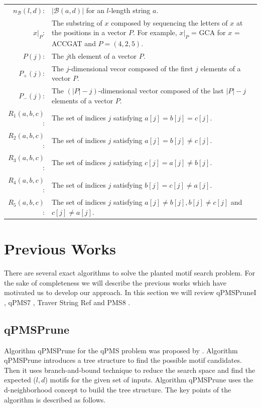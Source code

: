 \begin{table}
\begin{center}
\begin{tabular}{|r|p{280 pt}|}
			\\
			$n_{\mathcal{B}}(l,d)$:
			& $\lvert \mathcal{B}(a,d)\rvert$ for an $l$-length string $a$.
			\\
			$x|_{P}$:
			& The substring of $x$ composed by sequencing the letters of $x$ at the positions in a vector $P$. For example, $x|_{P}$ = GCA for $x$ = ACCGAT and $P = (4,2,5)$.\\
			$P(j)$:
			& The $j$th element of a vector $P$.\\
			$P_{+}(j)$:
 			& The $j$-dimensional vecor composed of the first $j$ elements of a vector $P$.\\
 			$P_{-}(j)$:
 			& The $(|P|-j)$-dimensional vector composed of the last $|P|-j$ elements of a vector $P$.\\
 			$R_1(a,b,c)$:
 			& The set of indices $j$ satisfying $a[j] = b[j] = c[j]$.\\
 			$R_2(a,b,c)$:
 			& The set of indices $j$ satisfying $a[j] = b[j] \neq c[j]$.\\
 			$R_3(a,b,c)$:
 			& The set of indices $j$ satisfying $c[j] = a[j] \neq b[j]$.\\
 			$R_4(a,b,c)$:
 			& The set of indices $j$ satisfying $b[j] = c[j] \neq a[j]$.\\
 			$R_5(a,b,c)$:
 			& The set of indices $j$ satisfying $a[j] \neq b[j], b[j] \neq c[j]$ and $c[j] \neq a[j]$.
 			\\ \hline
		\end{tabular}
	\end{center}
\end{table}



\section{Previous Works}
There are several exact algorithms to solve the planted motif search problem. For the sake of completeness we will describe the previous works which have motivated us to develop our approach. In this section we will review qPMSPruneI \cite{davila2007fast}, qPMS7 \cite{dinh2012qpms7}, Traver String Ref \cite{tanaka2014improved} and PMS8 \cite{nicolae2014efficient}.


\subsection{qPMSPrune}
Algorithm qPMSPrune for the qPMS problem was proposed by \cite{davila2007fast}. Algorithm qPMSPrune introduces a tree structure to find the possible motif candidates. Then it uses branch-and-bound technique to reduce the search space and find the expected ($l,d$) motifs for the given set of inputs. Algorithm qPMSPrune uses the d-neighborhood concept to build the tree structure. The key points of the algorithm is described as follows.

